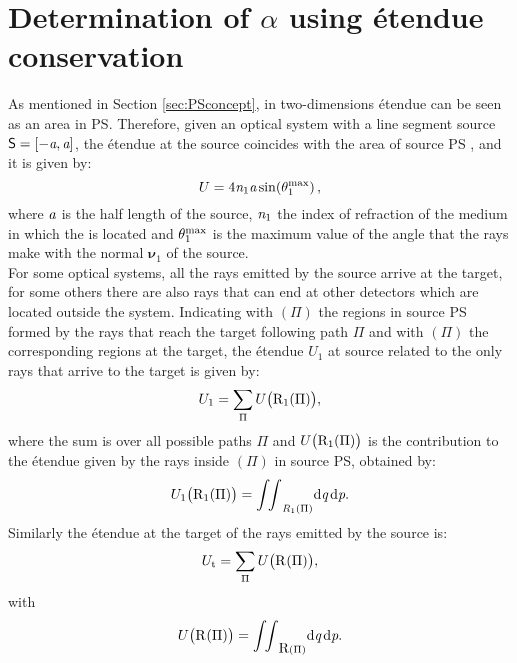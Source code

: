 \section{Determination of $\alpha$ using \'{e}tendue conservation} \label{sec:Tir_alpha}
As mentioned in Section \ref{sec:PSconcept}, in two-dimensions \'{e}tendue can be seen as an area in PS. 
Therefore, given an optical system with a line segment source $\textsf{S} = [-\textit{a}, \textit{a}]$, the \'{e}tendue at the source coincides with the area of source PS , and it is given by:
\begin{equation}\label{eq:etenduesource1}
U = 4\textit{n}_1 \textit{a} \sin(\theta_1^{\textrm{max}})\,,
\end{equation}
 where $\textit{a}$ is the half length of the source, $\textit{n}_1$ the index of refraction of the medium in which the  is located and $\theta_1^{\textrm{max}}$ is the maximum value of the angle that the rays make with the normal $\boldsymbol{\nu}_1$ of the source.\\ \indent 
For some optical systems, all the rays emitted by the source arrive at the target, for some others there are also rays that can end at other detectors which are located outside the system. 
Indicating with $(\Pi)$ the regions in source PS formed by the rays that reach the target following path $\Pi$ and with $(\Pi)$ the corresponding regions at the target, the \'{e}tendue $U_1$ at source related to the only rays that arrive to the target is given by:
\begin{equation}\label{eq:etenduesumsource}
U_1 = \sum_\Pi{U\big(\mbox{$\textup{R}_{\textit{$1$}}$}(\Pi)\big)},
\end{equation}
where the sum is over all possible paths $\Pi$ and $U\big(\mbox{$\textup{R}_{\textit{$1$}}$}(\Pi)\big)$ is the contribution to the \'{e}tendue given by the rays inside 
$(\Pi)$ in source PS, obtained by:
\begin{equation}\label{eq:etendueintegralsource}
U_1\big(\mbox{$\textup{R}_{\textit{$1$}}$}(\Pi)\big) = {\int\!\!\int}_{\emph{R}_1(\Pi)} \textrm{d}\textit{q}\,\textrm{d}\textit{p}.
\end{equation}
Similarly the \'{e}tendue at the target of the rays emitted by the source is:
\begin{equation}
U_\textrm{t}= \sum_\Pi{U\big(\mbox{$\textup{R}_{\textit{}}$}(\Pi)\big)},
\end{equation}
with
\begin{equation}\label{eq:etendueintegraltarget}
U\big(\mbox{$\textup{R}_{\textit{}}$}(\Pi)\big) = {\int\!\!\int}_{\mbox{$\textup{R}$}(\Pi)} \textrm{d}\textit{q}\,\textrm{d}\textit{p}.
\end{equation}
